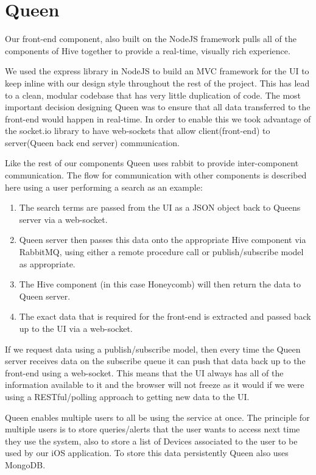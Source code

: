 \section{Queen}

Our front-end component, also built on the NodeJS framework pulls all of the
components of Hive together to provide a real-time, visually rich experience.

We used the express library in NodeJS to build an MVC framework for the UI to
keep inline with our design style throughout the rest of the project. This has
lead to a clean, modular codebase that has very little duplication of code.
The most important decision designing Queen was to ensure that all data
transferred to the front-end would happen in real-time. In order to enable this
we took advantage of the socket.io library to have web-sockets that allow
client(front-end) to server(Queen back end server) communication.

Like the rest of our components Queen uses rabbit to provide inter-component
communication. The flow for communication with other components is described here
using a user performing a search as an example:

\begin{enumerate}
  \item The search terms are passed from the UI as a JSON object back to Queens
  server via a web-socket.
  \item Queen server then passes this data onto the appropriate Hive component
  via RabbitMQ, using either a remote procedure call or publish/subscribe model
  as appropriate.
  \item The Hive component (in this case Honeycomb) will then return the data to
  Queen server.
  \item The exact data that is required for the front-end is extracted and
  passed back up to the UI via a web-socket.
\end{enumerate}

If we request data using a publish/subscribe model, then every time the Queen
server receives data on the subscribe queue it can push that data back up to the
front-end using a web-socket. This means that the UI always has all of the
information available to it and the browser will not freeze as it would if we
were using a RESTful/polling approach to getting new data to the UI.

Queen enables multiple users to all be using the service at once. The principle
for multiple users is to store queries/alerts that the user wants to access next
time they use the system, also to store a list of Devices associated to the user
to be used by our iOS application. To store this data persistently Queen also uses
MongoDB.

